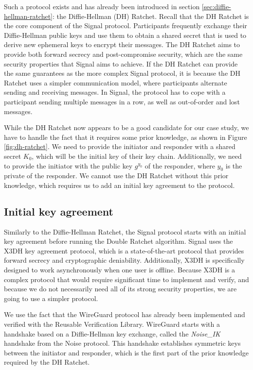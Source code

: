 Such a protocol exists and has already been introduced in section \ref{sec:diffie-hellman-ratchet}: the Diffie-Hellman (DH) Ratchet.
Recall that the DH Ratchet is the core component of the Signal protocol. Participants frequently exchange their Diffie-Hellman public keys and use them to obtain a shared secret that is used to derive new ephemeral keys to encrypt their messages.
The DH Ratchet aims to provide both forward secrecy and post-compromise security, which are the same security properties that Signal aims to achieve.
If the DH Ratchet can provide the same guarantees as the more complex Signal protocol, it is because the DH Ratchet uses a simpler communication model, where participants alternate sending and receiving messages.
In Signal, the protocol has to cope with a participant sending multiple messages in a row, as well as out-of-order and lost messages.

While the DH Ratchet now appears to be a good candidate for our case study, we have to handle the fact that it requires some prior knowledge, as shown in Figure \ref{fig:dh-ratchet}.
We need to provide the initiator and responder with a shared secret $K_0$, which will be the initial key of their key chain.
Additionally, we need to provide the initiator with the public key $g^{y_0}$ of the responder, where $y_0$ is the private of the responder.
We cannot use the DH Ratchet without this prior knowledge, which requires us to add an initial key agreement to the protocol.

\subsection{Initial key agreement}

Similarly to the Diffie-Hellman Ratchet, the Signal protocol starts with an initial key agreement before running the Double Ratchet algorithm.
Signal uses the X3DH key agreement protocol, which is a state-of-the-art protocol that provides forward secrecy and cryptographic deniability.
Additionally, X3DH is specifically designed to work asynchronously when one user is offline.
Because X3DH is a complex protocol that would require significant time to implement and verify, and because we do not necessarily need all of its strong security properties, we are going to use a simpler protocol.

We use the fact that the WireGuard protocol has already been implemented and verified with the Reusable Verification Library.
WireGuard starts with a handshake based on a Diffie-Hellman key exchange, called the \emph{Noise\_IK} handshake from the Noise protocol. This handshake establishes symmetric keys between the initiator and responder, which is the first part of the prior knowledge required by the DH Ratchet.

